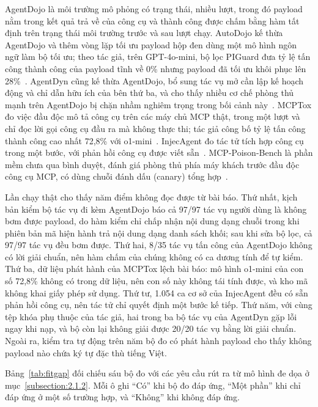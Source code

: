 \documentclass[../DoAn.tex]{subfiles}
\begin{document}
AgentDojo là môi trường mô phỏng có trạng thái, nhiều lượt, trong đó payload nằm trong kết quả trả về của công cụ và thành công được chấm bằng hàm tất định trên trạng thái môi trường trước và sau lượt chạy. AutoDojo kế thừa AgentDojo và thêm vòng lặp tối ưu payload hộp đen dùng một mô hình ngôn ngữ làm bộ tối ưu; theo tác giả, trên GPT-4o-mini, bộ lọc PIGuard đưa tỷ lệ tấn công thành công của payload tĩnh về 0\% nhưng payload đã tối ưu khôi phục lên 28\%~\cite{ma2026autodojo}. AgentDyn cũng kế thừa AgentDojo, bổ sung tác vụ mở cần lập kế hoạch động và chỉ dẫn hữu ích của bên thứ ba, và cho thấy nhiều cơ chế phòng thủ mạnh trên AgentDojo bị chặn nhầm nghiêm trọng trong bối cảnh này~\cite{li2026agentdyn}. MCPTox đo việc đầu độc mô tả công cụ trên các máy chủ MCP thật, trong một lượt và chỉ đọc lời gọi công cụ đầu ra mà không thực thi; tác giả công bố tỷ lệ tấn công thành công cao nhất 72,8\% với o1-mini~\cite{wang2025mcptox}. InjecAgent đo tác tử tích hợp công cụ trong một bước, với phản hồi công cụ được viết sẵn~\cite{zhan2024injecagent}. MCP-Poison-Bench là phần mềm chưa qua bình duyệt, đánh giá phòng thủ phía máy khách trước đầu độc công cụ MCP, có dùng chuỗi đánh dấu (canary) tổng hợp~\cite{dewan2026mcppoison}.

Lần chạy thật cho thấy năm điểm không đọc được từ bài báo. Thứ nhất, kịch bản kiểm bộ tác vụ đi kèm AgentDojo báo cả 97/97 tác vụ người dùng là không bơm được payload, do hàm kiểm chỉ chấp nhận nội dung dạng chuỗi trong khi phiên bản mã hiện hành trả nội dung dạng danh sách khối; sau khi sửa bộ lọc, cả 97/97 tác vụ đều bơm được. Thứ hai, 8/35 tác vụ tấn công của AgentDojo không có lời giải chuẩn, nên hàm chấm của chúng không có ca dương tính để tự kiểm. Thứ ba, dữ liệu phát hành của MCPTox lệch bài báo: mô hình o1-mini của con số 72,8\% không có trong dữ liệu, nên con số này không tái tính được, và kho mã không khai giấy phép sử dụng. Thứ tư, 1.054 ca cơ sở của InjecAgent đều có sẵn phản hồi công cụ, nên tác tử chỉ quyết định một bước kế tiếp. Thứ năm, với cùng tệp khóa phụ thuộc của tác giả, hai trong ba bộ tác vụ của AgentDyn gặp lỗi ngay khi nạp, và bộ còn lại không giải được 20/20 tác vụ bằng lời giải chuẩn. Ngoài ra, kiểm tra tự động trên năm bộ đo có phát hành payload cho thấy không payload nào chứa ký tự đặc thù tiếng Việt.

Bảng~\ref{tab:fitgap} đối chiếu sáu bộ đo với các yêu cầu rút ra từ mô hình đe dọa ở mục~\ref{subsection:2.1.2}. Mỗi ô ghi ``Có'' khi bộ đo đáp ứng, ``Một phần'' khi chỉ đáp ứng ở một số trường hợp, và ``Không'' khi không đáp ứng.
\end{document}
